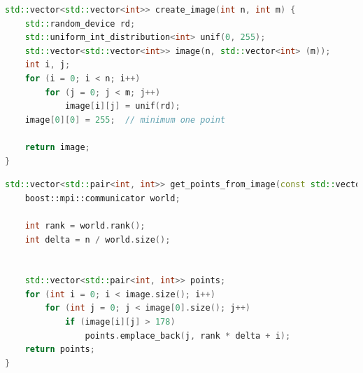 \documentclass[a4paper, 12pt]{article}
\begin{document}
\begin{lstlisting}[language=C++,caption=Создание изображения]
std::vector<std::vector<int>> create_image(int n, int m) {
    std::random_device rd;
    std::uniform_int_distribution<int> unif(0, 255);
    std::vector<std::vector<int>> image(n, std::vector<int> (m));
    int i, j;
    for (i = 0; i < n; i++)
        for (j = 0; j < m; j++)
            image[i][j] = unif(rd);
    image[0][0] = 255;  // minimum one point

    return image;
}
\end{lstlisting}

\bigbreak

\begin{lstlisting}[language=C++,caption=Бинаризация изображения]
std::vector<std::pair<int, int>> get_points_from_image(const std::vector<std::vector<int>> &image, int n) {
    boost::mpi::communicator world;

    int rank = world.rank();
    int delta = n / world.size();


    std::vector<std::pair<int, int>> points;
    for (int i = 0; i < image.size(); i++)
        for (int j = 0; j < image[0].size(); j++)
            if (image[i][j] > 178)
                points.emplace_back(j, rank * delta + i);
    return points;
}
\end{lstlisting}
\end{document}
